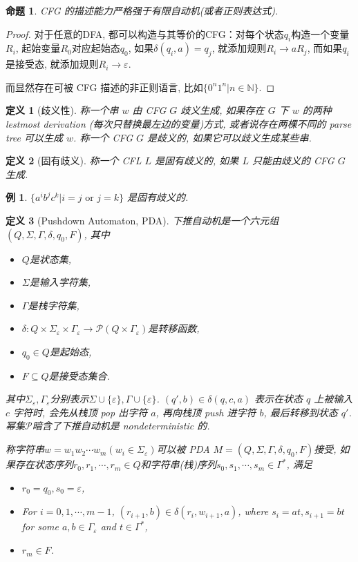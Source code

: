 \documentclass[8pt]{article}
\theoremstyle{compact}
\newtheorem{definition}{定义}
\newtheorem{proposition}{命题}
\newtheorem{example}{例}
\begin{document}
\begin{proposition}
	CFG 的描述能力严格强于有限自动机(或者正则表达式). 
\end{proposition}
\begin{proof}
	对于任意的DFA, 都可以构造与其等价的CFG：对每个状态$q_i$构造一个变量$R_i$, 起始变量$R_0$对应起始态$q_0$, 如果$\delta(q_i, a) = q_j$, 就添加规则$R_i \to aR_j$, 而如果$q_i$是接受态, 就添加规则$R_i \to \varepsilon$. 

	而显然存在可被 CFG 描述的非正则语言, 比如$\{0^n1^n | n \in \mathbb N\}$. 
\end{proof}
\begin{definition}[歧义性]
	称一个串 $w$ 由 CFG $G$ 歧义生成, 如果存在 $G$ 下 $w$ 的两种 lestmost derivation (每次只替换最左边的变量)方式, 或者说存在两棵不同的 parse tree 可以生成 $w$. 称一个 CFG $G$ 是歧义的, 如果它可以歧义生成某些串.
\end{definition}
\begin{definition}[固有歧义]
	称一个 CFL $L$ 是固有歧义的, 如果 $L$ 只能由歧义的 CFG $G$ 生成.
\end{definition}
\begin{example}
	$\{a^ib^jc^k | i = j \textrm{ or } j = k\}$ 是固有歧义的.
\end{example}
\begin{definition}[Pushdown Automaton, PDA]
	下推自动机是一个六元组$(Q, \Sigma, \Gamma, \delta, q_0, F)$, 其中
	\begin{itemize}
		\item $Q$是状态集, 
		\item $\Sigma$是输入字符集, 
		\item $\Gamma$是栈字符集, 
		\item $\delta: Q \times \Sigma_{\varepsilon} \times \Gamma_{\varepsilon} \to \mathcal P(Q \times \Gamma_{\varepsilon})$是转移函数, 
		\item $q_0 \in Q$是起始态, 
		\item $F \subseteq Q$是接受态集合. 
	\end{itemize}

	其中$\Sigma_{\varepsilon}, \Gamma_{\varepsilon}$分别表示$\Sigma \cup \{\varepsilon\}, \Gamma \cup \{\varepsilon\}$. $(q', b) \in \delta(q, c, a)$ 表示在状态 $q$ 上被输入 $c$ 字符时, 会先从栈顶 pop 出字符 $a$, 再向栈顶 push 进字符 $b$, 最后转移到状态 $q'$. 幂集$\mathcal P$暗含了下推自动机是 nondeterministic 的. 

	称字符串$w = w_1w_2\cdots w_m(w_i \in \Sigma_{\varepsilon})$可以被 PDA $M = (Q, \Sigma, \Gamma, \delta, q_0, F)$接受, 如果存在状态序列$r_0, r_1, \cdots, r_m \in Q$和字符串(栈)序列$s_0, s_1, \cdots, s_m \in \Gamma^*$, 满足
	\begin{itemize}
		\item $r_0 = q_0, s_0 = \varepsilon$,
		\item For $i = 0, 1, \cdots, m-1$, $(r_{i+1}, b) \in \delta(r_i, w_{i+1}, a)$, where $s_i = at, s_{i+1}=bt$ for some $a, b \in \Gamma_{\varepsilon}$ and $t \in \Gamma^*$,
		\item $r_m \in F$.
	\end{itemize}
\end{definition}
\end{document}

